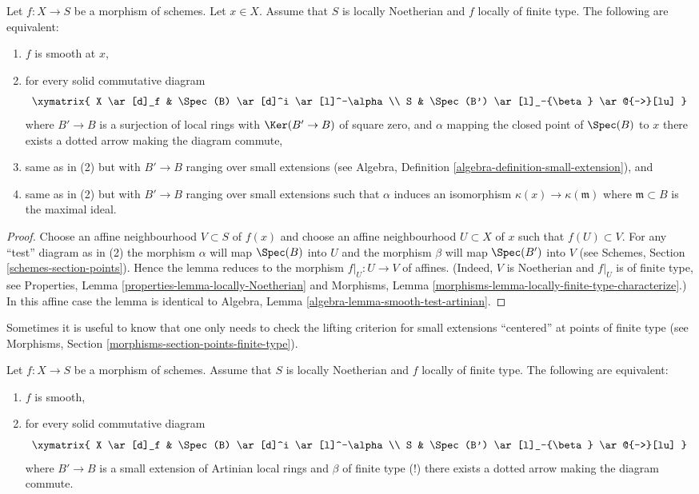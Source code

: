 \begin{lemma}
\label{lemma-lifting-along-artinian-at-point}
Let $f : X \to S$ be a morphism of schemes.
Let $x \in X$.
Assume that $S$ is locally Noetherian and $f$ locally of finite type.
The following are equivalent:
\begin{enumerate}
\item $f$ is smooth at $x$,
\item for every solid commutative diagram
$$
\xymatrix{
X \ar[d]_f & \Spec(B) \ar[d]^i \ar[l]^-\alpha \\
S & \Spec(B') \ar[l]_-{\beta} \ar@{-->}[lu]
}
$$
where $B' \to B$ is a surjection of local rings with
$\Ker(B' \to B)$ of square zero, and $\alpha$ mapping the
closed point of $\Spec(B)$ to $x$ there exists
a dotted arrow making the diagram commute,
\item same as in (2) but with $B' \to B$ ranging over small
extensions (see Algebra, Definition \ref{algebra-definition-small-extension}),
and
\item same as in (2) but with $B' \to B$ ranging over small
extensions such that $\alpha$ induces an isomorphism
$\kappa(x) \to \kappa(\mathfrak m)$ where $\mathfrak m \subset B$
is the maximal ideal.
\end{enumerate}
\end{lemma}

\begin{proof}
Choose an affine neighbourhood $V \subset S$ of $f(x)$ and choose an
affine neighbourhood $U \subset X$ of $x$ such that $f(U) \subset V$.
For any ``test'' diagram as in (2) the morphism $\alpha$ will map
$\Spec(B)$ into $U$ and the morphism $\beta$ will map $\Spec(B')$
into $V$ (see Schemes, Section \ref{schemes-section-points}).
Hence the lemma reduces to the morphism $f|_U : U \to V$ of affines.
(Indeed, $V$ is Noetherian and $f|_U$ is of finite type, see
Properties, Lemma \ref{properties-lemma-locally-Noetherian} and
Morphisms, Lemma \ref{morphisms-lemma-locally-finite-type-characterize}.)
In this affine case the lemma is identical to
Algebra, Lemma \ref{algebra-lemma-smooth-test-artinian}.
\end{proof}

\noindent
Sometimes it is useful to know that one only needs to check the
lifting criterion for small extensions ``centered'' at points
of finite type (see
Morphisms, Section \ref{morphisms-section-points-finite-type}).

\begin{lemma}
\label{lemma-lifting-along-artinian}
Let $f : X \to S$ be a morphism of schemes.
Assume that $S$ is locally Noetherian and $f$ locally of finite type.
The following are equivalent:
\begin{enumerate}
\item $f$ is smooth,
\item for every solid commutative diagram
$$
\xymatrix{
X \ar[d]_f & \Spec(B) \ar[d]^i \ar[l]^-\alpha \\
S & \Spec(B') \ar[l]_-{\beta} \ar@{-->}[lu]
}
$$
where $B' \to B$ is a small extension of Artinian local rings
and $\beta$ of finite type (!) there exists a dotted arrow making
the diagram commute.
\end{enumerate}
\end{lemma}

